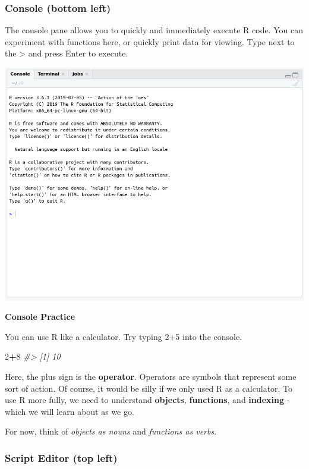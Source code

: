 \documentclass[]{article}
\newenvironment{Shaded}{\begin{snugshade}}{\end{snugshade}}
\newcommand{\CommentTok}[1]{\textcolor[rgb]{0.56,0.35,0.01}{\textit{#1}}}
\newcommand{\DecValTok}[1]{\textcolor[rgb]{0.00,0.00,0.81}{#1}}
\newcommand{\OperatorTok}[1]{\textcolor[rgb]{0.81,0.36,0.00}{\textbf{#1}}}
\begin{document}
\hypertarget{console-bottom-left}{%
\subsubsection{Console (bottom left)}\label{console-bottom-left}}

The console pane allows you to quickly and immediately execute R code.
You can experiment with functions here, or quickly print data for
viewing. Type next to the \textgreater{} and press Enter to execute.

\begin{center}\includegraphics[width=0.9\linewidth]{images/console} \end{center}

\textbf{Console Practice}

You can use R like a calculator. Try typing 2+5 into the console.

\begin{Shaded}
\begin{Highlighting}[]
\DecValTok{2}\OperatorTok{+}\DecValTok{8}
\CommentTok{#> [1] 10}
\end{Highlighting}
\end{Shaded}

Here, the plus sign is the \textbf{operator}. Operators are symbols that
represent some sort of action. Of course, it would be silly if we only
used R as a calculator. To use R more fully, we need to understand
\textbf{objects}, \textbf{functions}, and \textbf{indexing} - which we
will learn about as we go.

For now, think of \emph{objects as nouns} and \emph{functions as verbs}.

\hypertarget{script-editor-top-left}{%
\subsubsection{Script Editor (top left)}\label{script-editor-top-left}}
\end{document}
